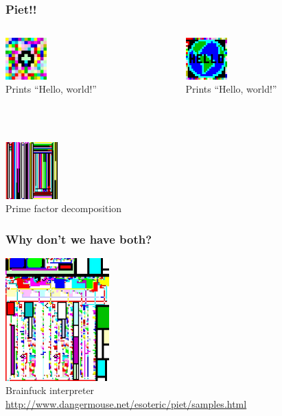 \documentclass[17pt]{beamer}
\renewcommand{\(}[1]{\begin{columns}[#1]}
\renewcommand{\)}{\end{columns}}
\newcommand{\<}[1]{\begin{column}{#1}}
\renewcommand{\>}{\end{column}}
\begin{document}
\begin{frame}
  \frametitle{Piet!!}
  \vspace{-0.5cm}
  \begin{columns}[t]
    \begin{column}{5cm}
      \begin{center}
        \includegraphics[width=1.6cm]{img/hw}\\
        {\small Prints ``Hello, world!''}
      \end{center}
    \end{column}
    \begin{column}{5cm}
      \begin{center}
      \includegraphics[width=1.6cm]{img/hw2}\\
      {\small Prints ``Hello, world!''}
      \end{center}
    \end{column}
  \end{columns}
  \begin{center}
    ~\\~\\
    \includegraphics[width=2cm]{img/pf}\\
    {\small Prime factor decomposition}
  \end{center}
\end{frame}




\begin{frame}
  \frametitle{Why don't we have both?}
  \begin{center}
    \includegraphics[width=4cm]{img/bf}\\
    {\footnotesize Brainfuck interpreter}\\
    \vspace{0.5cm}
    {\tiny \url{http://www.dangermouse.net/esoteric/piet/samples.html}}
  \end{center}
\end{frame}
\end{document}
